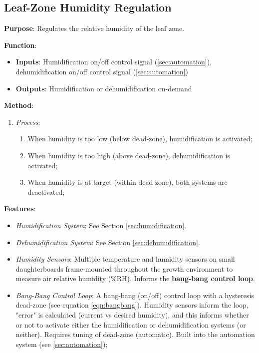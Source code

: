 \subsection{Leaf-Zone Humidity Regulation}
\label{sec:humidityregulation}

\textbf{Purpose}: Regulates the relative humidity of the leaf zone.

\textbf{Function}:
\begin{itemize}
    \item \textbf{Inputs}: Humidification on/off control signal (\ref{sec:automation}), dehumidification on/off control signal (\ref{sec:automation})
    \item \textbf{Outputs}: Humidification or dehumidification on-demand
\end{itemize}

\textbf{Method}:
\begin{enumerate}
    \item \textit{Process}:
    \begin{enumerate}
        \item When humidity is too low (below dead-zone), humidification is activated;
        \item When humidity is too high (above dead-zone), dehumidification is activated;
        \item When humidity is at target (within dead-zone), both systems are deactivated;
    \end{enumerate}
\end{enumerate}

\textbf{Features}:
\begin{itemize}
    \item \textit{Humidification System}: See Section \ref{sec:humidification}.
    \item \textit{Dehumidification System}: See Section \ref{sec:dehumidification}.
    \item \textit{Humidity Sensors}: Multiple temperature and humidity sensors \cite{sht31} on small daughterboards frame-mounted throughout the growth environment to measure air relative humidity (\%RH). Informs the \textbf{bang-bang control loop}.
    \item \textit{Bang-Bang Control Loop}: A bang-bang (on/off) control loop with a hysteresis dead-zone (see equation \ref{eqn:bangbang}). Humidity sensors inform the loop, "error" is calculated (current vs desired humidity), and this informs whether or not to activate either the humidification or dehumidification systems (or neither). Requires tuning of dead-zone (automatic). Built into the automation system (see \ref{sec:automation});
\end{itemize}

